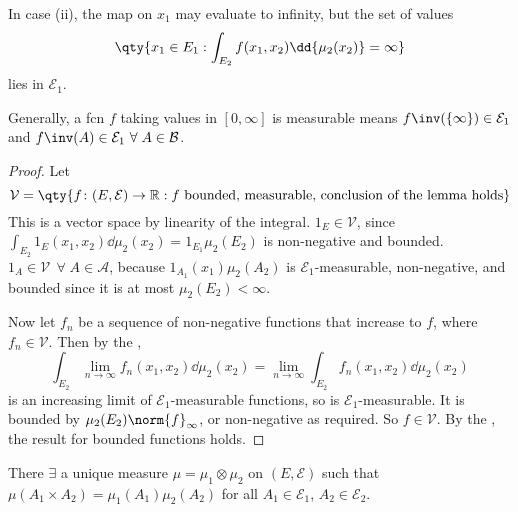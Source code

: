 \begin{remark}
	In case (ii), the map on $x_1$ may evaluate to infinity, but the set of values
	\[ \qty{x_1 \in E_1 : \int_{E_2} f(x_1,x_2) \dd{\mu_2(x_2)} = \infty} \]
	lies in $\mathcal E_1$.

	Generally, a fcn $f$ taking values in $[0, \infty]$ is measurable means $f\inv(\{\infty\}) \in \mathcal{E}_1$ and $f\inv(A) \in \mathcal{E}_1 \ \forall \; A \in \mathcal{B}$.
\end{remark}

\begin{proof}
	Let
	\[ \mathcal V = \qty{f \colon (E,\mathcal E) \to \mathbb R : f \text{ bounded, measurable, conclusion of the lemma holds}} \]
	This is a vector space by linearity of the integral.
	$1_E \in \mathcal V$, since $\int_{E_2} 1_E(x_1,x_2) \dd{\mu_2(x_2)} = 1_{E_1} \mu_2(E_2)$ is non-negative and bounded.
	$1_A \in \mathcal V \ \ \forall \; A \in \mathcal A$, because $1_{A_1}(x_1) \mu_2(A_2)$ is $\mathcal E_1$-measurable, non-negative, and bounded since it is at most $\mu_2(E_2) < \infty$.

	Now let $f_n$ be a sequence of non-negative functions that increase to $f$, where $f_n \in \mathcal V$.
	Then by the ,
	\[ \int_{E_2} \lim_{n \to \infty} f_n(x_1, x_2) \dd{\mu_2(x_2)} = \lim_{n \to \infty} \int_{E_2} f_n(x_1, x_2) \dd{\mu_2(x_2)} \]
	is an increasing limit of $\mathcal E_1$-measurable functions, so is $\mathcal E_1$-measurable.
	It is bounded by $\mu_2(E_2) \norm{f}_\infty$, or non-negative as required.
	So $f \in \mathcal V$.
	By the , the result for bounded functions holds.

\end{proof}

\begin{theorem}
	There $\exists$ a unique measure $\mu = \mu_1 \otimes \mu_2$ on $(E, \mathcal E)$ such that $\mu(A_1 \times A_2) = \mu_1(A_1) \mu_2(A_2)$ for all $A_1 \in \mathcal E_1$, $A_2 \in \mathcal E_2$.
\end{theorem}

